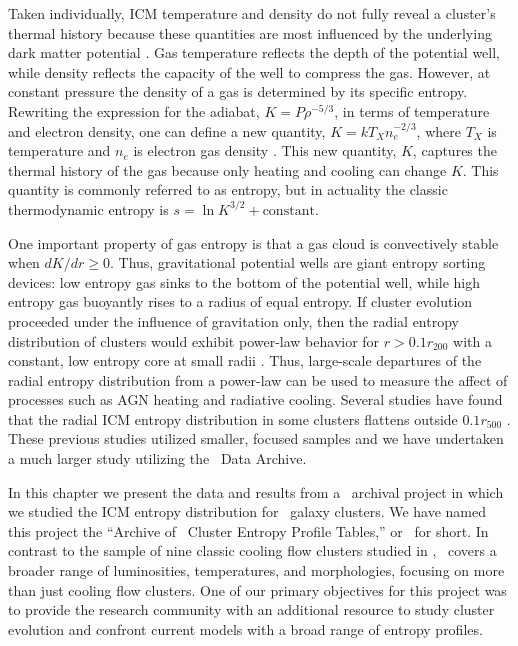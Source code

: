 Taken individually, ICM temperature and density do not fully reveal a
cluster's thermal history because these quantities are most influenced
by the underlying dark matter potential \citep{voitbryan}. Gas
temperature reflects the depth of the potential well, while density
reflects the capacity of the well to compress the gas. However, at
constant pressure the density of a gas is determined by its specific
entropy. Rewriting the expression for the adiabat, $K=P\rho^{-5/3}$,
in terms of temperature and electron density, one can define a new
quantity, $K=kT_X n_e^{-2/3}$, where $T_X$ is temperature and $n_e$ is
electron gas density \citep{1999Natur.397..135P, davies00}. This new
quantity, $K$, captures the thermal history of the gas because only
heating and cooling can change $K$. This quantity is commonly referred
to as entropy, but in actuality the classic thermodynamic entropy is
$s = \ln K^{3/2} + \mathrm{constant}$.

One important property of gas entropy is that a gas cloud is
convectively stable when $dK/dr \geq 0$. Thus, gravitational potential
wells are giant entropy sorting devices: low entropy gas sinks to the
bottom of the potential well, while high entropy gas buoyantly rises
to a radius of equal entropy. If cluster evolution proceeded under the
influence of gravitation only, then the radial entropy distribution of
clusters would exhibit power-law behavior for $r > 0.1 r_{200}$ with a
constant, low entropy core at small radii \citep{voitbryan}. Thus,
large-scale departures of the radial entropy distribution from a
power-law can be used to measure the affect of processes such as AGN
heating and radiative cooling. Several studies have found that the
radial ICM entropy distribution in some clusters flattens outside $0.1
r_{500}$ \citep{1996ApJ...473..692D, 1999Natur.397..135P, davies00,
  2003MNRAS.343..331P, piffaretti05, radioquiet, d06,
  morandi07}. These previous studies utilized smaller, focused samples
and we have undertaken a much larger study utilizing the
\chandra\ Data Archive.

In this chapter we present the data and results from a
\chandra\ archival project in which we studied the ICM entropy
distribution for \entsuppnum\ galaxy clusters. We have named this
project the ``Archive of \chandra\ Cluster Entropy Profile Tables,''
or \accept\ for short. In contrast to the sample of nine classic
cooling flow clusters studied in \citet[][hereafter D06]{d06},
\accept\ covers a broader range of luminosities, temperatures, and
morphologies, focusing on more than just cooling flow clusters. One of
our primary objectives for this project was to provide the research
community with an additional resource to study cluster evolution and
confront current models with a broad range of entropy profiles.

